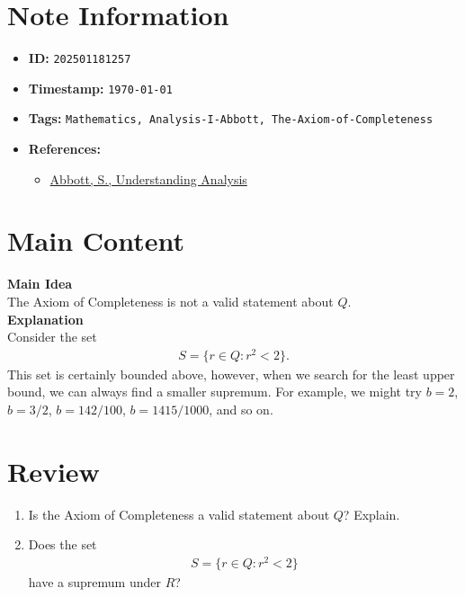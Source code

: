 \clearpage
{}
\label{202501181257}
\renewcommand{\notetitle}{Q and the Axiom of Completeness}

\section*{Note Information}
\begin{itemize}
  \item \textbf{ID:} \texttt{202501181257}
  \item \textbf{Timestamp:} \texttt{\today \ \currenttime}
  \item \textbf{Tags:} \texttt{Mathematics, Analysis-I-Abbott, The-Axiom-of-Completeness}
  \item \textbf{References:}
    \begin{itemize}
      \item \href{/home/garrett/Personal/References/Mathematics/Analysis-I/Abbott.pdf}{Abbott, S., Understanding Analysis}
    \end{itemize}
\end{itemize}


\section*{Main Content}
\textbf{Main Idea}\\
The Axiom of Completeness is not a valid statement about $Q$.\\

\textbf{Explanation}\\
Consider the set
\begin{align*}
  S = \{r \in Q : r^2 < 2 \}.
\end{align*}
This set is certainly bounded above, however, when we search for the least upper bound, we can always find a smaller supremum. For example, we might try $b = 2$, $b = 3/2$, $b=142/100$, $b = 1415/1000$, and so on. 


\section*{Review}
\begin{enumerate}
  \item Is the Axiom of Completeness a valid statement about $Q$? Explain.
  \item Does the set
    \begin{align*}
      S = \{ r \in Q : r^2 < 2 \}
    \end{align*}
    have a supremum under $R$?
\end{enumerate}


